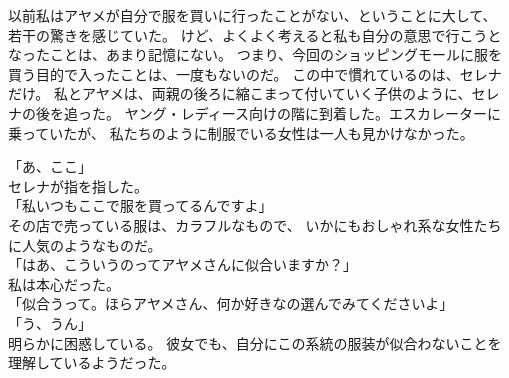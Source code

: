 \documentclass[../IHMain]{subfiles}
\begin{document}
以前私はアヤメが自分で服を買いに行ったことがない、ということに大して、
若干の驚きを感じていた。
けど、よくよく考えると私も自分の意思で行こうとなったことは、あまり記憶にない。
つまり、今回のショッピングモールに服を買う目的で入ったことは、一度もないのだ。
この中で慣れているのは、セレナだけ。
私とアヤメは、両親の後ろに縮こまって付いていく子供のように、セレナの後を追った。
ヤング・レディース向けの階に到着した。エスカレーターに乗っていたが、
私たちのように制服でいる女性は一人も見かけなかった。

「あ、ここ」\\
セレナが指を指した。\\
「私いつもここで服を買ってるんですよ」\\
その店で売っている服は、カラフルなもので、
いかにもおしゃれ系な女性たちに人気のようなものだ。\\
「はあ、こういうのってアヤメさんに似合いますか？」\\
私は本心だった。\\
「似合うって。ほらアヤメさん、何か好きなの選んでみてくださいよ」\\
「う、うん」\\
明らかに困惑している。
彼女でも、自分にこの系統の服装が似合わないことを理解しているようだった。
\end{document}
